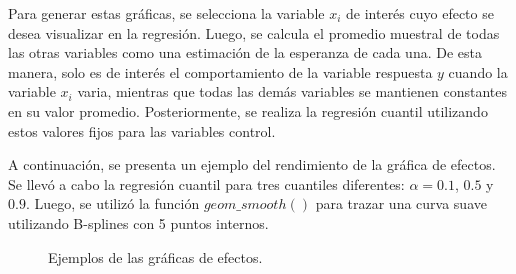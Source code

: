 Para generar estas gráficas, se selecciona la variable $x_i$ de interés cuyo efecto se desea visualizar en la regresión. Luego, se calcula el promedio muestral de todas las otras variables como una estimación de la esperanza de cada una. De esta manera, solo es de interés el comportamiento de la variable respuesta $y$ cuando la variable $x_i$ varia, mientras que todas las demás variables se mantienen constantes en su valor promedio. Posteriormente, se realiza la regresión cuantil utilizando estos valores fijos para las variables control.

A continuación, se presenta un ejemplo del rendimiento de la gráfica de efectos. Se llevó a cabo la regresión cuantil para tres cuantiles diferentes: $\alpha = 0.1$, $0.5$ y $0.9$. Luego, se utilizó la función $geom\_smooth()$ para trazar una curva suave utilizando B-splines con 5 puntos internos. 

\begin{figure}[H]
 \centering
    \caption{Ejemplos de las gráficas de efectos.}
    \label{fig:Efectos}
\end{figure}

